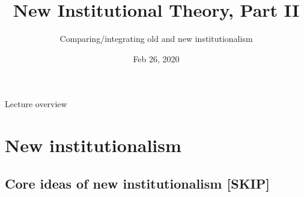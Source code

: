 
% 
 

\usepackage{comment}




%


\title[EDUC 250B] {New Institutional Theory, Part II}
\subtitle{Comparing/integrating old and new institutionalism}
\date{Feb 26, 2020}

\usepackage{Sweave}



\begin{frame}
	\titlepage
\end{frame}

\begin{frame}{Lecture overview}

	\tableofcontents
\end{frame}


\section[New institutionalism]{New institutionalism}

\subsection[Review]{Core ideas of new institutionalism [SKIP]}

